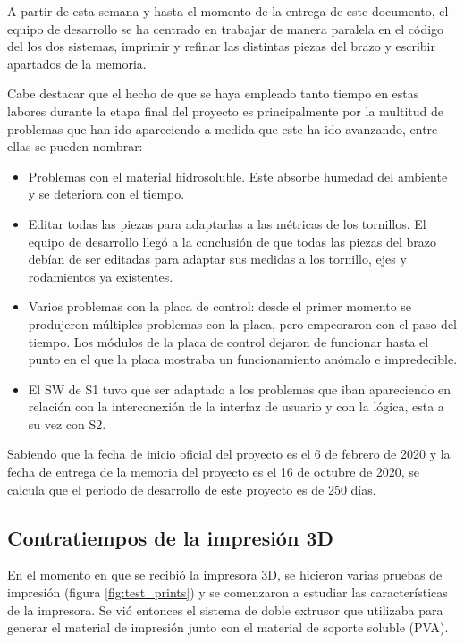 A partir de esta semana y hasta el momento de la entrega de este documento, el equipo de desarrollo se ha centrado en trabajar de manera paralela en el código del los dos sistemas, imprimir y refinar las distintas piezas del brazo y escribir apartados de la memoria.

Cabe destacar que el hecho de que se haya empleado tanto tiempo en estas labores durante la etapa final del proyecto es principalmente por la multitud de problemas que han ido apareciendo a medida que este ha ido avanzando, entre ellas se pueden nombrar:

\begin{itemize}
    \item Problemas con el material hidrosoluble. Este absorbe humedad del ambiente y se deteriora con el tiempo.
    \item Editar todas las piezas para adaptarlas a las métricas de los tornillos. El equipo de desarrollo llegó a la conclusión de que todas las piezas del brazo debían de ser editadas para adaptar sus medidas a los tornillo, ejes y rodamientos ya existentes.
    \item Varios problemas con la placa de control: desde el primer momento se produjeron múltiples problemas con la placa, pero empeoraron con el paso del tiempo. Los módulos de la placa de control dejaron de funcionar hasta el punto en el que la placa mostraba un funcionamiento anómalo e impredecible.
    \item El \ac{SW} de \ac{S1} tuvo que ser adaptado a
    los problemas que iban apareciendo en relación con la interconexión de la interfaz de usuario y con la lógica, esta a su vez con \ac{S2}.
\end{itemize}

Sabiendo que la fecha de inicio oficial del proyecto es el 6 de febrero de 2020 y la fecha de entrega de la memoria del proyecto es el 16 de octubre de 2020, se calcula que el periodo de desarrollo de este proyecto es de 250 días.

\subsection{Contratiempos de la impresión 3D}
En el momento en que se recibió la impresora 3D, se hicieron varias pruebas de
impresión (figura \ref{fig:test_prints}) y se comenzaron a estudiar las características
de la impresora. Se vió entonces el sistema de doble extrusor que utilizaba para
generar el material de impresión junto con el material de soporte soluble (\ac{PVA}).

